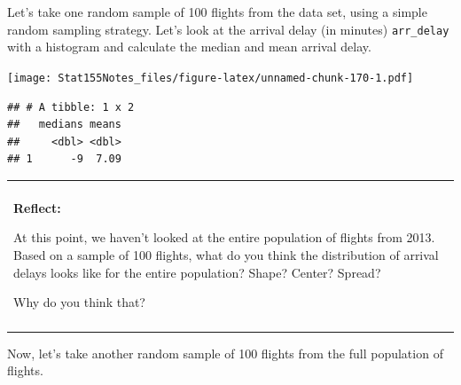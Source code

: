 \documentclass[]{book}
\newenvironment{Shaded}{\begin{snugshade}}{\end{snugshade}}
\newcommand{\CommentTok}[1]{\textcolor[rgb]{0.56,0.35,0.01}{\textit{#1}}}
\newcommand{\DataTypeTok}[1]{\textcolor[rgb]{0.13,0.29,0.53}{#1}}
\newcommand{\DecValTok}[1]{\textcolor[rgb]{0.00,0.00,0.81}{#1}}
\newcommand{\KeywordTok}[1]{\textcolor[rgb]{0.13,0.29,0.53}{\textbf{#1}}}
\newcommand{\NormalTok}[1]{#1}
\newcommand{\OperatorTok}[1]{\textcolor[rgb]{0.81,0.36,0.00}{\textbf{#1}}}
\newcommand{\StringTok}[1]{\textcolor[rgb]{0.31,0.60,0.02}{#1}}
\newenvironment{reflect}
{
    \begin{center}
    
    \begin{tabular}{|p{0.8\textwidth}|}
    \rowcolor{LightBlue}
    \hline\\
    \rowcolor{LightBlue}
    \textbf{Reflect:}
}
{
    \\\rowcolor{LightBlue}
    \\\hline
    \end{tabular} 
    \end{center}
}
\begin{document}
Let's take one random sample of 100 flights from the data set, using a simple random sampling strategy. Let's look at the arrival delay (in minutes) \texttt{arr\_delay} with a histogram and calculate the median and mean arrival delay.

\begin{Shaded}
\end{Shaded}

\texttt{[image: Stat155Notes\_files/figure-latex/unnamed-chunk-170-1.pdf]}

\begin{Shaded}
\end{Shaded}

\begin{verbatim}
## # A tibble: 1 x 2
##   medians means
##     <dbl> <dbl>
## 1      -9  7.09
\end{verbatim}

\begin{reflect}
At this point, we haven't looked at the entire population of flights
from 2013. Based on a sample of 100 flights, what do you think the
distribution of arrival delays looks like for the entire population?
Shape? Center? Spread?

Why do you think that?
\end{reflect}

Now, let's take another random sample of 100 flights from the full population of flights.

\begin{Shaded}
\end{Shaded}
\end{document}
